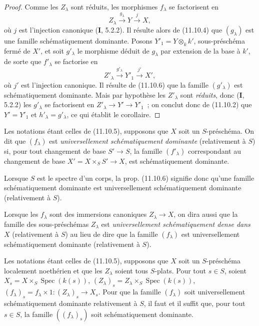 \begin{proof}
Comme les $Z_\lambda$ sont réduits, les morphismes $f_\lambda$ se factorisent
en
\[
Z_\lambda\xrightarrow{g_\lambda}Y\xrightarrow{j}X,
\]
où $j$ est l'injection canonique ($\mathbf I$, 5.2.2). Il résulte alors de
(11.10.4) que $(g_\lambda)$ est une famille schématiquement dominante. Posons
$Y'_1=Y\otimes_k k'$, sous-préschéma fermé de $X'$, et soit $g'_\lambda$ le
morphisme déduit de $g_\lambda$ par extension de la base à $k'$, de sorte que
$f'_\lambda$ se factorise en
\[
Z'_\lambda\xrightarrow{g'_\lambda}Y'_1\xrightarrow{j'}X',
\]
où $j'$ est l'injection canonique. Il résulte de (11.10.6) que la famille
$(g'_\lambda)$ est schématiquement dominante. Mais par hypothèse les
$Z'_\lambda$ sont \emph{réduits}, donc ($\mathbf I$, 5.2.2) les
$g'_\lambda$ se factorisent en $Z'_\lambda\to Y'\to Y'_1$~; on conclut donc
de (11.10.2) que $Y'=Y'_1$ et $h'_\lambda=g'_\lambda$, ce qui établit le
corollaire.
\end{proof}

\begin{definition}[11.10.8]
\label{IV.11.10.8-fr}
Les notations étant celles de (11.10.5), supposons que $X$ soit un
$S$-préschéma. On dit que $(f_\lambda)$ est \emph{universellement
schématiquement dominante} (relativement à $S$) si, pour tout changement de
base $S'\to S$, la famille $(f'_\lambda)$ correspondant au changement de base
$X'=X\times_SS'\to X$, est schématiquement dominante.
\end{definition}

Lorsque $S$ est le spectre d'un corps, la prop. (11.10.6) signifie donc qu'une
famille schématiquement dominante est universellement schématiquement
dominante (relativement à $S$).

Lorsque les $f_\lambda$ sont des immersions canoniques $Z_\lambda\to X$, on
dira aussi que la famille des sous-préschémas $Z_\lambda$ est
\emph{universellement schématiquement dense dans $X$} (relativement à $S$) au
lieu de dire que la famille $(f_\lambda)$ est universellement schématiquement
dominante (relativement à $S$).

\begin{theorem}[11.10.9]
\label{IV.11.10.9-fr}
Les notations étant celles de (11.10.5), supposons que $X$ soit un
$S$-préschéma localement noethérien et que les $Z_\lambda$ soient tous
$S$-plats. Pour tout $s\in S$, soient
$X_s=X\times_S\operatorname{Spec}(k(s))$,
$(Z_\lambda)_s=Z_\lambda\times_S\operatorname{Spec}(k(s))$,
$(f_\lambda)_s=f_\lambda\times1:(Z_\lambda)_s\to X_s$. Pour que la famille
$(f_\lambda)$ soit universellement schématiquement dominante relativement à
$S$, il faut et il suffit que, pour tout $s\in S$, la famille
$((f_\lambda)_s)$ soit schématiquement dominante.
\end{theorem}

